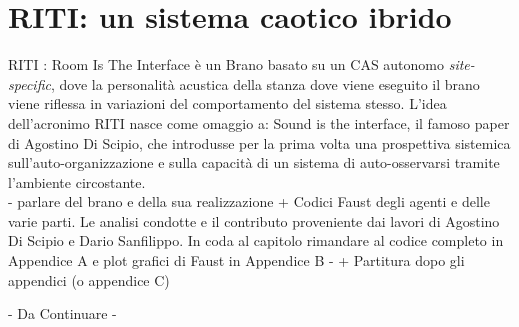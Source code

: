 \section{RITI: un sistema caotico ibrido}
\label{sec:RITI: un sistema caotico ibrido}

RITI : Room Is The Interface è un Brano basato su un CAS autonomo \textit{site-specific},
dove la personalità acustica della stanza dove viene eseguito il brano
viene riflessa in variazioni del comportamento del sistema stesso.
L'idea dell'acronimo RITI nasce come omaggio a: Sound is the interface, 
il famoso paper di Agostino Di Scipio, che introdusse per la prima volta
una prospettiva sistemica sull'auto-organizzazione e sulla capacità
di un sistema di auto-osservarsi tramite l'ambiente circostante. \\





- parlare del brano e della sua realizzazione +
Codici Faust degli agenti e delle varie parti.
Le analisi condotte e il contributo proveniente dai lavori
di Agostino Di Scipio e Dario Sanfilippo.
In coda al capitolo rimandare al codice completo in Appendice A e plot
grafici di Faust in Appendice B -
+ Partitura dopo gli appendici (o appendice C)

\begin{center} \vspace{0.5cm} \Huge - Da Continuare - \normalsize \vspace{0.5cm} \end{center}
